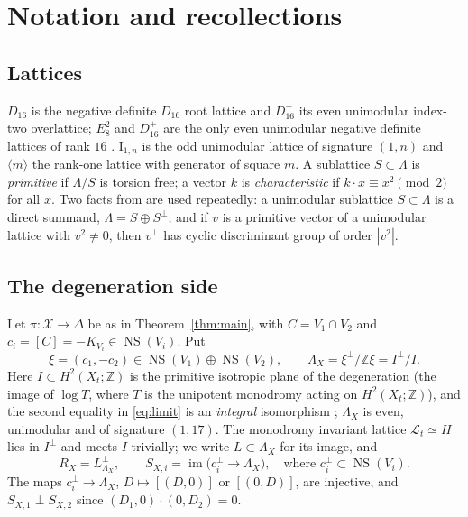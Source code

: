 \documentclass[11pt]{article}
\newcommand{\Z}{\mathbb Z}
\newcommand{\NS}{\operatorname{NS}}
\newcommand{\im}{\operatorname{im}}
\newcommand{\calX}{\mathcal X}
\newcommand{\calL}{\mathcal L}
\newcommand{\I}{\mathrm{I}}
\theoremstyle{definition}
\theoremstyle{remark}
\begin{document}
\section{Notation and recollections}\label{sec:recall}

\subsection{Lattices}

\(D_{16}\) is the negative definite \(D_{16}\) root lattice and
\(D_{16}^+\) its even unimodular index-two overlattice; \(E_8^2\) and
\(D_{16}^+\) are the only even unimodular negative definite lattices of
rank \(16\) \cite[\S8]{Se}. \(\I_{1,n}\) is the odd unimodular lattice
of signature \((1,n)\) and \(\langle m\rangle\) the rank-one lattice
with generator of square \(m\). A sublattice \(S\subset\Lambda\) is
\emph{primitive} if \(\Lambda/S\) is torsion free; a vector \(k\) is
\emph{characteristic} if \(k\cdot x\equiv x^2\pmod 2\) for all \(x\).
Two facts from \cite{Ni} are used repeatedly: a unimodular sublattice
\(S\subset\Lambda\) is a direct summand, \(\Lambda=S\oplus S^\perp\);
and if \(v\) is a primitive vector of a unimodular lattice with
\(v^2\neq0\), then \(v^\perp\) has cyclic discriminant group of order
\(|v^2|\).

\subsection{The degeneration side}\label{sec:degside}

Let \(\pi\colon\calX\to\Delta\) be as in Theorem~\ref{thm:main}, with
\(C=V_1\cap V_2\) and \(c_i=[C]=-K_{V_i}\in\NS(V_i)\). Put
\begin{equation}\label{eq:limit}
 \xi=(c_1,-c_2)\in\NS(V_1)\oplus\NS(V_2),\qquad
 \Lambda_X=\xi^\perp/\Z\xi=I^\perp/I .
\end{equation}
Here \(I\subset H^2(X_t;\Z)\) is the primitive isotropic plane of the
degeneration (the image of \(\log T\), where \(T\) is the unipotent
monodromy acting on \(H^2(X_t;\Z)\)), and the second equality in \eqref{eq:limit} is an
\emph{integral} isomorphism \cite[Proposition~3.5]{GT}; \(\Lambda_X\)
is even, unimodular and of signature \((1,17)\). The monodromy
invariant lattice \(\calL_t\simeq H\) lies in \(I^\perp\) and meets
\(I\) trivially; we write \(L\subset\Lambda_X\) for its image, and
\begin{equation}\label{eq:SX}
 R_X=L^\perp_{\Lambda_X},\qquad
 S_{X,i}=\im\bigl(c_i^\perp\longrightarrow\Lambda_X\bigr),
 \quad\text{where } c_i^\perp\subset\NS(V_i).
\end{equation}
The maps \(c_i^\perp\to\Lambda_X\), \(D\mapsto[(D,0)]\) or
\([(0,D)]\), are injective, and \(S_{X,1}\perp S_{X,2}\) since
\((D_1,0)\cdot(0,D_2)=0\).
\end{document}
